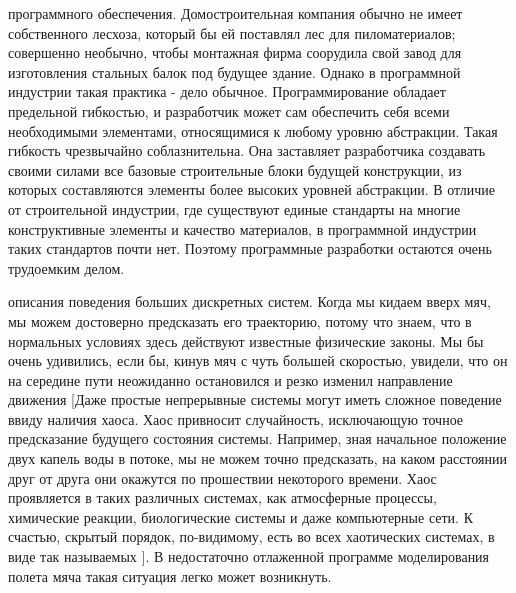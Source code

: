 \documentclass[11pt]{article}
\begin{document}
{ программного обеспечения.} Домостроительная компания обычно не имеет собственного лесхоза, который бы ей поставлял лес для пиломатериалов; совершенно необычно, чтобы монтажная фирма соорудила свой завод для изготовления стальных балок под будущее здание. Однако в программной индустрии такая практика - дело обычное. Программирование обладает предельной гибкостью, и разработчик может сам обеспечить себя всеми необходимыми элементами, относящимися к любому уровню абстракции. Такая гибкость чрезвычайно соблазнительна. Она заставляет разработчика создавать своими силами все базовые строительные блоки будущей конструкции, из которых составляются элементы более высоких уровней абстракции. В отличие от строительной индустрии, где существуют единые стандарты на многие конструктивные элементы и качество материалов, в программной индустрии таких стандартов почти нет. Поэтому программные разработки остаются очень трудоемким делом.
\par
{ описания поведения больших дискретных систем.} Когда мы кидаем вверх мяч, мы можем достоверно предсказать его траекторию, потому что знаем, что в нормальных условиях здесь действуют известные физические законы. Мы бы очень удивились, если бы, кинув мяч с чуть большей скоростью, увидели, что он на середине пути неожиданно остановился и резко изменил направление движения [Даже простые непрерывные системы могут иметь сложное поведение ввиду наличия хаоса. Хаос привносит случайность, исключающую точное предсказание будущего состояния системы. Например, зная начальное положение двух капель воды в потоке, мы не можем точно предсказать, на каком расстоянии друг от друга они окажутся по прошествии некоторого времени. Хаос проявляется в таких различных системах, как атмосферные процессы, химические реакции, биологические системы и даже компьютерные сети. К счастью, скрытый порядок, по-видимому, есть во всех хаотических системах, в виде так называемых {}]. В недостаточно отлаженной программе моделирования полета мяча такая ситуация легко может возникнуть.
\end{document}
